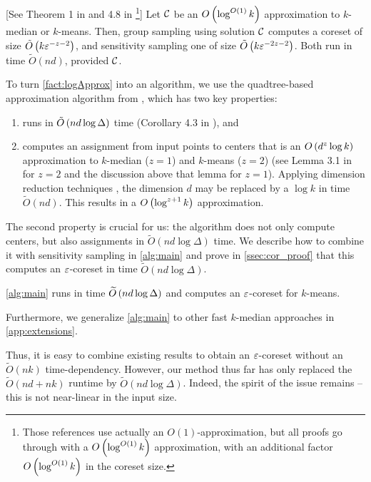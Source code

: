 \begin{fact}\label{fact:logApprox}[See Theorem 1 in \cite{stoc21} and 4.8 in \cite{FeldmanL11}\footnote{Those references use actually an $O(1)$-approximation,
    but all proofs go through with a  $O\left( \log^{O(1)} k\right)$ approximation, with an additional factor  $O\left( \log^{O(1)} k\right)$ in the coreset size.}]
    Let $\mathcal C$ be an $O\left( \log^{O(1)} k\right)$ approximation to $k$-median or $k$-means.  Then, group sampling using solution $\mathcal C$ computes a coreset of
    size $\tilde O\left( k \varepsilon^{-z-2}\right)$, and sensitivity sampling one of size $\tilde O\left( k \varepsilon^{-2z-2}\right)$.  Both run in time $\tilde O(nd)$,
    provided $\mathcal C$.  \end{fact}

To turn \cref{fact:logApprox} into an algorithm, we use the quadtree-based \fkmeans approximation algorithm from \cite{cohen2020fast}, which has two key
properties: 
\begin{enumerate}
\item \fkmeans runs in $\tilde O\left( n d \log \Delta\right)$ time (Corollary 4.3 in \cite{cohen2020fast}), and
\item \fkmeans computes an assignment from input points to centers that is an $O\left( d^z \log k\right)$ approximation to $k$-median ($z=1$) and $k$-means ($z=2$)
    (see Lemma 3.1 in \cite{cohen2020fast} for $z=2$ and the discussion above that lemma for $z=1$). Applying dimension reduction techniques \cite{MakarychevMR19}, the dimension
    $d$ may be replaced by a $\log k$ in time $\tilde O(nd)$. This results in a $O\left(\log^{z+1} k\right)$ approximation. 
\end{enumerate}

The second property is crucial for us: the algorithm does not only compute centers, but also assignments in $\tilde{O}(nd\log \Delta)$ time.  We describe how to
combine it with sensitivity sampling in \cref{alg:main} and prove in \cref{ssec:cor_proof} that this computes an $\varepsilon$-coreset in time $\tilde O(nd \log \Delta)$.

\begin{corollary}\label{cor:mainAlg}
\cref{alg:main} runs in time $\widetilde O\left( n d \log \Delta\right)$ and computes an $\varepsilon$-coreset for $k$-means.
\end{corollary}
Furthermore, we generalize \cref{alg:main} to other fast $k$-median approaches in \cref{app:extensions}.

Thus, it is easy to combine existing results to obtain an $\varepsilon$-coreset without an $\widetilde{O}(nk)$ time-dependency.  However, our method thus far has only
replaced the $\widetilde{O}(nd + nk)$ runtime by $\widetilde{O}(nd \log \Delta)$. Indeed, the spirit of the issue remains -- this is not near-linear in the input size.

